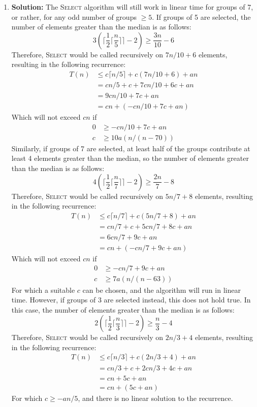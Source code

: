 \documentclass{article}
\begin{document}
\begin{enumerate}
\item \textbf{Solution:} The \textsc{Select} algorithm will still work in linear time for groups of 7, or rather, for any odd number of groups $\geq 5$. If groups of 5 are selected, the number of elements greater than the median is as follows:
$$ 3\left(\bigg\lceil\frac{1}{2}\Big\lceil\frac{n}{5}\Big\rceil\bigg\rceil-2\right) \geq \frac{3n}{10}-6$$
Therefore, \textsc{Select} would be called recursively on $7n/10 + 6$ elements, resulting in the following recurrence:
\begin{align*}
T(n) &\leq c\lceil n/5 \rceil + c(7n/10 + 6) + an \\
& = cn/5 + c + 7cn/10 + 6c + an \\
& = 9cn/10 + 7c + an \\
& = cn + (-cn/10 + 7c + an)
\end{align*}
Which will not exceed $cn$ if 
\begin{align*}
0 &\geq -cn/10 + 7c + an \\
c &\geq 10a(n/(n-70))
\end{align*}
Similarly, if groups of 7 are selected, at least half of the groups contribute at least 4 elements greater than the median, so the number of elements greater than the median is as follows:
$$ 4\left(\bigg\lceil\frac{1}{2}\Big\lceil\frac{n}{7}\Big\rceil\bigg\rceil-2\right) \geq \frac{2n}{7}-8$$
Therefore, \textsc{Select} would be called recursively on $5n/7 + 8$ elements, resulting in the following recurrence:
\begin{align*}
T(n) &\leq c\lceil n/7 \rceil + c(5n/7 + 8) + an \\
& = cn/7 + c + 5cn/7 + 8c + an \\
& = 6cn/7 + 9c + an \\
& = cn + (-cn/7 + 9c + an)
\end{align*}
Which will not exceed $cn$ if 
\begin{align*}
0 &\geq -cn/7 + 9c + an \\
c &\geq 7a(n/(n-63))
\end{align*}
For which a suitable $c$ can be chosen, and the algorithm will run in linear time. However, if groups of 3 are selected instead, this does not hold true. In this case, the number of elements greater than the median is as follows:
$$ 2\left(\bigg\lceil\frac{1}{2}\Big\lceil\frac{n}{3}\Big\rceil\bigg\rceil-2\right) \geq \frac{n}{3}-4$$
Therefore, \textsc{Select} would be called recursively on $2n/3 + 4$ elements, resulting in the following recurrence:
\begin{align*}
T(n) &\leq c\lceil n/3 \rceil + c(2n/3 + 4) + an \\
& = cn/3 + c + 2cn/3 + 4c + an \\
& = cn + 5c + an \\ 
& = cn + (5c + an)
\end{align*}
For which $c \geq -an/5$, and there is no linear solution to the recurrence.


\end{enumerate}
\end{document}
